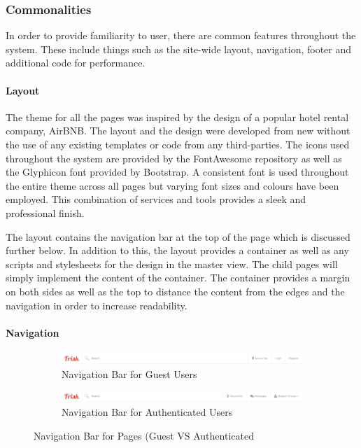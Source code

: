 \subsubsection{Commonalities}
In order to provide familiarity to user, there are common features throughout the system. These include things such as the site-wide layout, navigation, footer and additional code for performance.

\paragraph{Layout}
The theme for all the pages was inspired by the design of a popular hotel rental company, AirBNB\cite{AirBnB:Home}. The layout and the design were developed from new without the use of any existing templates or code from any third-parties. The icons used throughout the system are provided by the FontAwesome repository as well as the Glyphicon font provided by Bootstrap. A consistent font is used throughout the entire theme across all pages but varying font sizes and colours have been employed. This combination of services and tools provides a sleek and professional finish.

The layout contains the navigation bar at the top of the page which is discussed further below. In addition to this, the layout provides a container as well as any scripts and stylesheets for the design in the master view. The child pages will simply implement the content of the container. The container provides a margin on both sides as well as the top to distance the content from the edges and the navigation in order to increase readability.

\paragraph{Navigation}

\begin{figure}[H]
	\centering
	\begin{subfigure}[t]{1\textwidth}
		\centering
		\includegraphics[width=1.0\textwidth]{images/Frisk/Nav_Default}
		\caption{Navigation Bar for Guest Users}\label{fig:Nav_Default}		
	\end{subfigure}
	\quad
	\begin{subfigure}[t]{1\textwidth}
		\centering
		\includegraphics[width=1.0\textwidth]{images/Frisk/Nav_Authenticated}
		\caption{Navigation Bar for Authenticated Users}\label{fig:Nav_Authenticated}
	\end{subfigure}
	\caption{Navigation Bar for Pages (Guest VS Authenticated}\label{fig:AuthVSDefaultNav}
\end{figure}

